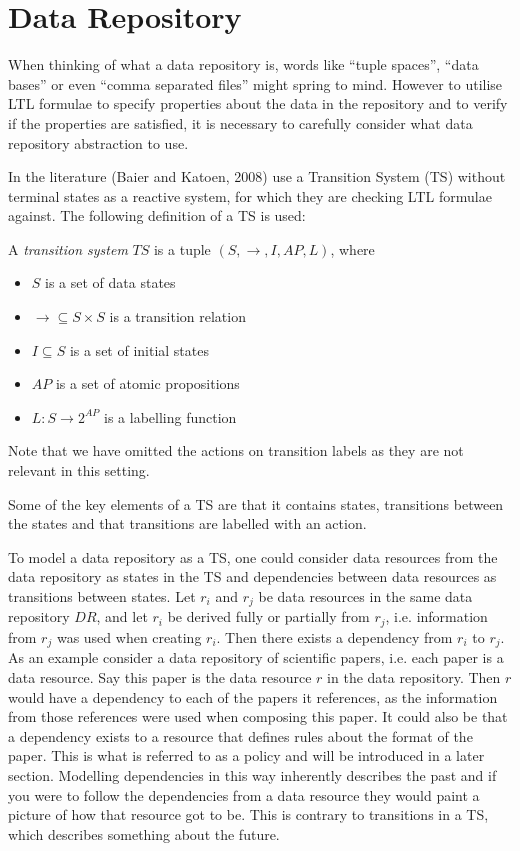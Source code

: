 \section{Data Repository}\label{sec:data-repository}
When thinking of what a data repository is, words like ``tuple spaces'', ``data bases'' or even ``comma separated files'' might spring to mind. However to utilise LTL formulae to specify properties about the data in the repository and to verify if the properties are satisfied, it is necessary to carefully consider what data repository abstraction to use. 

In the literature (Baier and Katoen, 2008)\cite{baier2008principles} use a Transition System (TS) without terminal states as a reactive system, for which they are checking LTL formulae against. The following definition of a TS is used:
\begin{definition}\label{def:ts}
A \emph{transition system} $TS$ is a tuple $\left(S, \longrightarrow, I, AP, L \right)$, where
\begin{itemize}
  \item $S$ is a set of data states
  \item $\longrightarrow \subseteq S \times S$ is a transition relation
  \item $I \subseteq S$ is a set of initial states
  \item $AP$ is a set of atomic propositions
  \item $L : S \rightarrow 2^{AP}$ is a labelling function
\end{itemize}
Note that we have omitted the actions on transition labels as they are not relevant in this setting.
\end{definition}
Some of the key elements of a TS are that it contains states, transitions between the states and that transitions are labelled with an action.

To model a data repository as a TS, one could consider data resources from the data repository as states in the TS and dependencies between data resources as transitions between states. Let $r_i$ and $r_j$ be data resources in the same data repository $DR$, and let $r_i$ be derived fully or partially from $r_j$, i.e. information from $r_j$ was used when creating $r_i$. Then there exists a dependency from $r_i$ to $r_j$. As an example consider a data repository of scientific papers, i.e. each paper is a data resource. Say this paper is the data resource $r$ in the data repository. Then $r$ would have a dependency to each of the papers it references, as the information from those references were used when composing this paper. It could also be that a dependency exists to a resource that defines rules about the format of the paper. This is what is referred to as a policy and will be introduced in a later section. Modelling dependencies in this way inherently describes the past and if you were to follow the dependencies from a data resource they would paint a picture of how that resource got to be. This is contrary to transitions in a TS, which describes something about the future.

